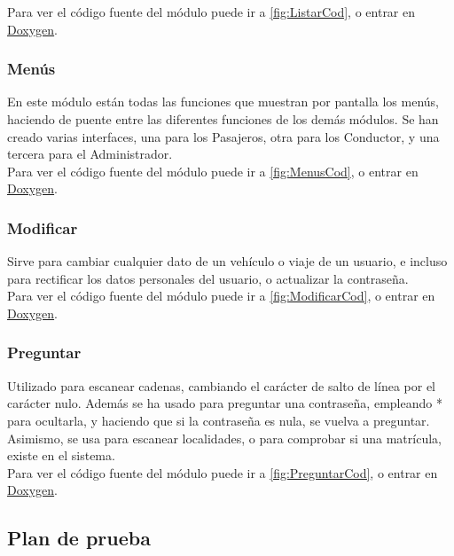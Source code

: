 Para ver el código fuente del módulo puede ir a \ref{fig:ListarCod}, o entrar en \href{DOC_DOXYGEN/listar_8h_source.html}{Doxygen}.
\label{fig:Listar}

\subsubsection{Menús}

En este módulo están todas las funciones que muestran por pantalla los menús, haciendo de puente entre las diferentes funciones de los demás módulos.
Se han creado varias interfaces, una para los Pasajeros, otra para los Conductor, y una tercera para el Administrador.\\

Para ver el código fuente del módulo puede ir a \ref{fig:MenusCod}, o entrar en \href{DOC_DOXYGEN/menus_8h_source.html}{Doxygen}.
\label{fig:Menus}

\subsubsection{Modificar}

Sirve para cambiar cualquier dato de un vehículo o viaje de un usuario, e incluso para rectificar los datos personales del usuario, o actualizar la contraseña.\\

Para ver el código fuente del módulo puede ir a \ref{fig:ModificarCod}, o entrar en \href{DOC_DOXYGEN/modificar_8h_source.html}{Doxygen}.
\label{fig:Modificar}

\subsubsection{Preguntar}

Utilizado para escanear cadenas, cambiando el carácter de salto de línea por el carácter nulo. Además se ha usado para preguntar una contraseña,
empleando * para ocultarla, y haciendo que si la contraseña es nula, se vuelva a preguntar. Asimismo, se usa para escanear localidades, o para comprobar si una matrícula, existe en el sistema.\\

Para ver el código fuente del módulo puede ir a \ref{fig:PreguntarCod}, o entrar en \href{DOC_DOXYGEN/preguntar_8h_source.html}{Doxygen}.
\label{fig:Preguntar}

\subsection{Plan de prueba}

